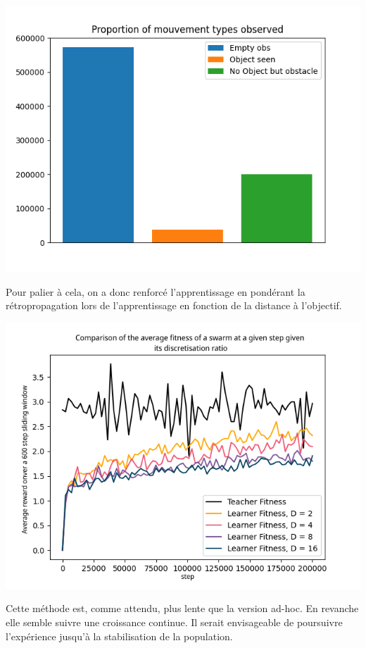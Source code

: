 \documentclass[a4paper, 12pt]{report}
\begin{document}
\begin{center}
\includegraphics[scale = 0.5]{Proportions}
\end{center}	

	Pour palier à cela, on a donc renforcé l'apprentissage en pondérant la rétropropagation lors de l'apprentissage en fonction de la distance à l'objectif.

\begin{center}
	\includegraphics{averageComparisons}
\end{center}	
	
Cette méthode est, comme attendu, plus lente que la version ad-hoc. En revanche elle semble suivre une croissance continue. Il serait envisageable de poursuivre l'expérience jusqu'à la stabilisation de la population.
	
\end{document}
